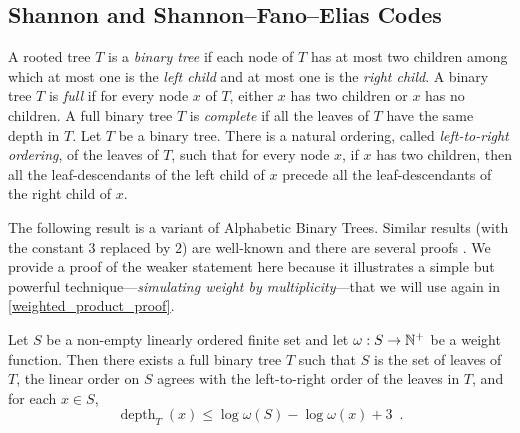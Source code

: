 \documentclass{patmorin}
\renewcommand{\le}{\leqslant}
\newcommand{\defin}[1]{\emph{\textcolor{brightmaroon}{#1}}}
\DeclareMathOperator{\depth}{depth}
\begin{document}
\subsection{Shannon and Shannon--Fano--Elias Codes}

A rooted tree $T$ is a \defin{binary tree} if each node of $T$ has at most two children among which at most one is the \defin{left child} and at most one is the \defin{right child}.
A binary tree $T$ is \defin{full} if for every node $x$ of $T$,
either $x$ has two children or $x$ has no children.
A full binary tree $T$ is \defin{complete} if all the leaves of $T$ have the same depth in $T$.
Let $T$ be a binary tree. There is a natural ordering, called \defin{left-to-right ordering}, of the leaves of $T$, such that for every node $x$, if $x$ has two children, then all the leaf-descendants of the left child of $x$ precede all the leaf-descendants of the right child of $x$.

The following result is a variant of Alphabetic Binary Trees. Similar results (with the constant $3$ replaced by $2$) are well-known and there are several proofs \cite{knuth:art_iii,mehlhorn:nearly,gilbert.moore:variable_length}. We provide a proof of the weaker statement here because it illustrates a simple but powerful technique---\defin{simulating weight by multiplicity}---that we will use again in \cref{weighted_product_proof}.

\begin{lem}\label{shannon_fano_elias_tree}
  Let $S$ be a non-empty linearly ordered finite set and let $\omega:S\to\mathbb{N}^+$ be a weight function. Then there exists a full binary tree $T$ such that $S$ is the set of leaves of $T$,
  the linear order on $S$ agrees with the left-to-right order of the leaves in $T$, and for each $x\in S$,
  \[
    \depth_{T}(x)\le \log\omega(S) - \log\omega(x) + 3 \enspace.
  \]
\end{lem}
\end{document}
